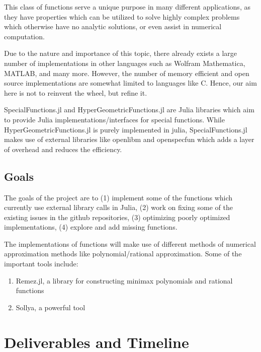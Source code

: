 \documentclass{article}
\theoremstyle{mytheoremstyle}
\theoremstyle{mytheoremstyle}
\theoremstyle{myproblemstyle}
\begin{document}
   This class of functions serve a unique purpose in many different applications, as they have properties which can be utilized to solve highly complex problems which otherwise have no analytic solutions, or even assist in numerical computation.


    Due to the nature and importance of this topic, there already exists a large number of implementations in other languages such as Wolfram Mathematica, MATLAB, and many more.
    However, the number of memory efficient and open source implementations are somewhat limited to languages like C. 
    Hence, our aim here is not to reinvent the wheel, but refine it. 

    SpecialFunctions.jl and HyperGeometricFunctions.jl are Julia libraries which aim to provide Julia implementations/interfaces for special functions.
    While HyperGeometricFunctions.jl is purely implemented in julia, SpecialFunctions.jl makes use of external libraries like openlibm and openspecfun which adds a layer of overhead and reduces the efficiency.



    
    \subsection*{Goals}\label{sub:Literature Review} %
      The goals of the project are to (1) implement some of the functions which currently use external library calls in Julia, (2) work on fixing some of the existing issues in the github repositories, (3) optimizing poorly optimized implementations, (4) explore and add missing functions. 

      The implementations of functions will make use of different methods  of numerical approximation methods like polynomial/rational approximation. 
      Some of the important tools include: \begin{enumerate}
        \item Remez.jl, a library for constructing minimax polynomials and rational functions 
        \item Sollya, a powerful tool 
      \end{enumerate}
    
  \section*{Deliverables and Timeline}\label{sec:Methods} %
\end{document}
